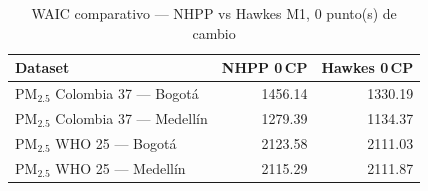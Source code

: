 \begin{table}[htbp]
\centering
\caption{WAIC comparativo --- NHPP vs Hawkes M1, 0 punto(s) de cambio}
\label{tab:comp_waic_0cp}
\begin{tabular}{lrr}
\toprule
Dataset & NHPP 0\,CP & Hawkes 0\,CP \\
\midrule
PM$_{2.5}$ Colombia 37 --- Bogot\'{a} & 1456.14 & 1330.19 \\
PM$_{2.5}$ Colombia 37 --- Medell\'{i}n & 1279.39 & 1134.37 \\
PM$_{2.5}$ WHO 25 --- Bogot\'{a} & 2123.58 & 2111.03 \\
PM$_{2.5}$ WHO 25 --- Medell\'{i}n & 2115.29 & 2111.87 \\
\bottomrule
\end{tabular}
\end{table}
